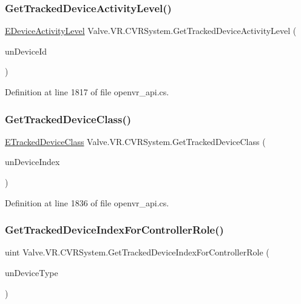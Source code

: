 \subsubsection{\texorpdfstring{GetTrackedDeviceActivityLevel()}{GetTrackedDeviceActivityLevel()}}
{\footnotesize\ttfamily \mbox{\hyperlink{namespace_valve_1_1_v_r_a44a7a02e482d63dc5e0c0851a2ad775e}{E\+Device\+Activity\+Level}} Valve.\+V\+R.\+C\+V\+R\+System.\+Get\+Tracked\+Device\+Activity\+Level (\begin{DoxyParamCaption}\item[{uint}]{un\+Device\+Id }\end{DoxyParamCaption})}



Definition at line 1817 of file openvr\+\_\+api.\+cs.

\mbox{\label{class_valve_1_1_v_r_1_1_c_v_r_system_ac397038d675df987d6da168edb72068d}} 
\subsubsection{\texorpdfstring{GetTrackedDeviceClass()}{GetTrackedDeviceClass()}}
{\footnotesize\ttfamily \mbox{\hyperlink{namespace_valve_1_1_v_r_aa1a3c2765fe53acb85372a57652c47a1}{E\+Tracked\+Device\+Class}} Valve.\+V\+R.\+C\+V\+R\+System.\+Get\+Tracked\+Device\+Class (\begin{DoxyParamCaption}\item[{uint}]{un\+Device\+Index }\end{DoxyParamCaption})}



Definition at line 1836 of file openvr\+\_\+api.\+cs.

\mbox{\label{class_valve_1_1_v_r_1_1_c_v_r_system_a44fda444e868474cbc41dd2fc1fe8d81}} 
\subsubsection{\texorpdfstring{GetTrackedDeviceIndexForControllerRole()}{GetTrackedDeviceIndexForControllerRole()}}
{\footnotesize\ttfamily uint Valve.\+V\+R.\+C\+V\+R\+System.\+Get\+Tracked\+Device\+Index\+For\+Controller\+Role (\begin{DoxyParamCaption}\item[{\mbox{\hyperlink{namespace_valve_1_1_v_r_a7814f024ae1755837d784b5263e05792}{E\+Tracked\+Controller\+Role}}}]{un\+Device\+Type }\end{DoxyParamCaption})}




